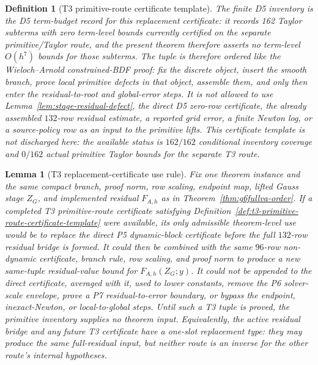 \documentclass[preprint,12pt]{elsarticle}
\newtheorem{definition}{Definition}
\newtheorem{lemma}{Lemma}
\begin{document}
\begin{definition}[T3 primitive-route certificate template]
The finite D5 inventory is the D5 term-budget record for this replacement
certificate: it records 162 Taylor subterms with zero term-level bounds
currently certified on the separate primitive/Taylor route, and the present
theorem therefore asserts no term-level \(O(h^7)\) bounds for those subterms.
The tuple is therefore ordered like the Wieloch--Arnold constrained-BDF proof:
fix the discrete object, insert the smooth branch, prove local primitive
defects in that object, assemble them, and only then enter the residual-to-root
and global-error steps.  It is not allowed to use
Lemma~\ref{lem:stage-residual-defect}, the direct D5 zero-row certificate, the
already assembled \(132\)-row residual estimate, a reported grid error, a
finite Newton log, or a source-policy row as an input to the primitive lifts.
This certificate template is not discharged here: the available status is
\(162/162\) conditional inventory coverage and \(0/162\) actual primitive
Taylor bounds for the separate T3 route.
\end{definition}

\begin{lemma}[T3 replacement-certificate use rule]
\label{lem:t3-replacement-certificate-use-rule}
Fix one theorem instance and the same compact branch, proof norm, row scaling,
endpoint map, lifted Gauss stage \(Z_G\), and implemented residual
\(F_{A,h}\) as in Theorem~\ref{thm:g6fullva-order}.  If a completed T3
primitive-route certificate satisfying
Definition~\ref{def:t3-primitive-route-certificate-template} were available,
its only admissible theorem-level use would be to replace the direct P5
dynamic-block certificate before the full \(132\)-row residual bridge is
formed.  It could then be combined with the same \(96\)-row non-dynamic
certificate, branch rule, row scaling, and proof norm to produce a new
same-tuple residual-value bound for \(F_{A,h}(Z_G;y)\).  It could not be
appended to the direct certificate, averaged with it, used to lower constants,
remove the P6 solver-scale envelope, prove a P7 residual-to-error boundary,
or bypass the endpoint, inexact-Newton, or local-to-global steps.  Until such
a T3 tuple is proved, the primitive inventory supplies no theorem input.
Equivalently, the active residual bridge and any future T3 certificate have a
one-slot replacement type: they may produce the same full-residual input, but
neither route is an inverse for the other route's internal hypotheses.
\end{lemma}
\end{document}
